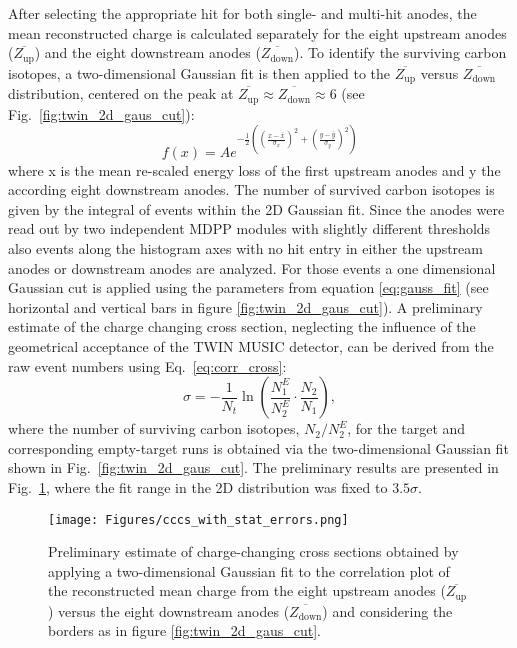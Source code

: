 After selecting the appropriate hit for both single- and multi-hit anodes, the mean reconstructed charge is calculated separately for the eight upstream anodes ($\overline{Z_{\text{up}}}$) and the eight downstream anodes ($\overline{Z_{\text{down}}}$). To identify the surviving carbon isotopes, a two-dimensional Gaussian fit is then applied to the $\overline{Z_{\text{up}}}$ versus $\overline{Z_{\text{down}}}$ distribution, centered on the peak at $\overline{Z_{\text{up}}} \approx \overline{Z_{\text{down}}} \approx 6$ (see Fig.~\ref{fig:twin_2d_gaus_cut}):
\begin{equation}
f(x) = A e^{-\frac{1}{2}((\frac{x - \bar{x}}{\sigma_{x}})^2 +(\frac{y - \bar{y}}{\sigma_{y}})^2)}
\label{eq:gauss_fit}
\end{equation}
where x is the mean re-scaled energy loss of the first upstream anodes and y the according eight downstream anodes. The number of survived carbon isotopes is given by the integral of events within the 2D Gaussian fit. Since the anodes were read out by two independent MDPP modules with slightly different thresholds also events along the histogram axes with no hit entry in either the upstream anodes or downstream anodes are analyzed. For those events a one dimensional Gaussian cut is applied using the parameters from equation \ref{eq:gauss_fit} (see horizontal and vertical bars in figure \ref{fig:twin_2d_gaus_cut}).\newline
A preliminary estimate of the charge changing cross section, neglecting the influence of the geometrical acceptance of the TWIN MUSIC detector, can be derived from the raw event numbers using Eq.~\ref{eq:corr_cross}:
\[
    \sigma = -\frac{1}{N_t} \ln\left(\frac{N_1^E}{N_2^E} \cdot \frac{N_2}{N_1}\right),
\]
where the number of surviving carbon isotopes, $N_2/N_2^E$, for the target and corresponding empty-target runs is obtained via the two-dimensional Gaussian fit shown in Fig.~\ref{fig:twin_2d_gaus_cut}. The preliminary results are presented in Fig.~\ref{fig:cccs_gaus_with_errors}, where the fit range in the 2D distribution was fixed to $3.5\sigma$.

\begin{figure}[htpb]
    \centering
    \texttt{[image: Figures/cccs\_with\_stat\_errors.png]}
    \caption{
    Preliminary estimate of charge-changing cross sections obtained by applying a two-dimensional Gaussian fit to the correlation plot of the reconstructed mean charge from the eight upstream anodes ($\overline{Z_{\text{up}}}$) versus the eight downstream anodes ($\overline{Z_{\text{down}}}$) and considering the borders as in figure \ref{fig:twin_2d_gaus_cut}.
     }
    \label{fig:cccs_gaus_with_errors}
\end{figure}

